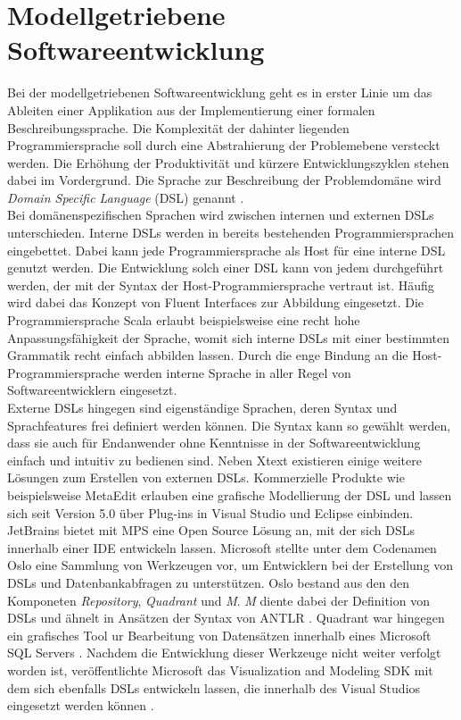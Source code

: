 \documentclass[a4paper,12pt]{scrreprt}
\begin{document}
\section{Modellgetriebene Softwareentwicklung}
Bei der modellgetriebenen Softwareentwicklung geht es in erster Linie um das Ableiten einer Applikation aus der Implementierung einer formalen Beschreibungssprache. Die Komplexität der dahinter liegenden Programmiersprache soll durch eine Abstrahierung der Problemebene versteckt werden. Die Erhöhung der Produktivität und kürzere Entwicklungszyklen stehen dabei im Vordergrund. Die Sprache zur Beschreibung der Problemdomäne wird \textit{Domain Specific Language} (DSL) genannt \cite{mdsd}.
\\
Bei domänenspezifischen Sprachen wird zwischen internen und externen DSLs unterschieden. Interne DSLs werden in bereits bestehenden Programmiersprachen eingebettet. Dabei kann jede Programmiersprache als Host für eine interne DSL genutzt werden. Die Entwicklung solch einer DSL kann von jedem durchgeführt werden, der mit der Syntax der Host-Programmiersprache vertraut ist. Häufig wird dabei das Konzept von Fluent Interfaces zur Abbildung eingesetzt. Die Programmiersprache Scala erlaubt beispielsweise eine recht hohe Anpassungsfähigkeit der Sprache, womit sich interne DSLs mit einer bestimmten Grammatik recht einfach abbilden lassen. Durch die enge Bindung an die Host-Programmiersprache werden interne Sprache in aller Regel von Softwareentwicklern eingesetzt.
\\
Externe DSLs hingegen sind eigenständige Sprachen, deren Syntax und Sprachfeatures frei definiert werden können. Die Syntax kann so gewählt werden, dass sie auch für Endanwender ohne Kenntnisse in der Softwareentwicklung einfach und intuitiv zu bedienen sind. Neben Xtext existieren einige weitere Lösungen zum Erstellen von externen DSLs.
Kommerzielle Produkte wie beispielsweise MetaEdit erlauben eine grafische Modellierung der DSL und lassen sich seit Version 5.0 über Plug-ins in Visual Studio und Eclipse einbinden. JetBrains bietet mit MPS eine Open Source Lösung an, mit der sich DSLs innerhalb einer IDE entwickeln lassen. 
Microsoft stellte unter dem Codenamen Oslo eine Sammlung von Werkzeugen vor, um Entwicklern bei der Erstellung von DSLs und Datenbankabfragen zu unterstützen. Oslo bestand aus den den Komponeten \textit{Repository}, \textit{Quadrant} und \textit{M}. \textit{M} diente dabei der Definition von DSLs und ähnelt in Ansätzen der Syntax von ANTLR \cite{programmingLanguageM}. Quadrant war hingegen ein grafisches Tool ur Bearbeitung von Datensätzen innerhalb eines Microsoft SQL Servers \cite{quadrantOverview}. Nachdem die Entwicklung dieser Werkzeuge nicht weiter verfolgt worden ist, veröffentlichte Microsoft das Visualization and Modeling SDK mit dem sich ebenfalls DSLs entwickeln lassen, die innerhalb des Visual Studios eingesetzt werden können \cite{visualizationAndModelingSdk}. 
\end{document}
